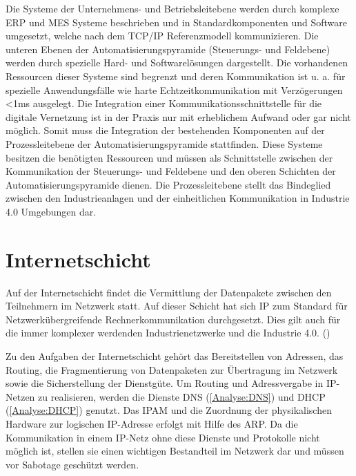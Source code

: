 Die Systeme der Unternehmens- und Betriebsleitebene werden durch komplexe \ac{ERP} und \ac{MES} Systeme beschrieben und in Standardkomponenten und Software umgesetzt, welche nach dem \ac{TCP}/\ac{IP} Referenzmodell kommunizieren. Die unteren Ebenen der Automatisierungspyramide (Steuerungs- und Feldebene) werden durch spezielle Hard- und Softwarelösungen dargestellt. Die vorhandenen Ressourcen dieser Systeme sind begrenzt und deren Kommunikation ist u. a. für spezielle Anwendungsfälle wie harte Echtzeitkommunikation mit Verzögerungen <1ms ausgelegt. Die Integration einer Kommunikationsschnittstelle für die digitale Vernetzung ist in der Praxis nur mit erheblichem Aufwand oder gar nicht möglich. Somit muss die Integration der bestehenden Komponenten auf der Prozessleitebene der Automatisierungspyramide stattfinden. Diese Systeme besitzen die benötigten Ressourcen und müssen als Schnittstelle zwischen der Kommunikation der Steuerungs- und Feldebene und den oberen Schichten der Automatisierungspyramide dienen. Die Prozessleitebene stellt das Bindeglied zwischen den Industrieanlagen und der einheitlichen Kommunikation in Industrie 4.0 Umgebungen dar. 

\section{Internetschicht}
Auf der Internetschicht findet die Vermittlung der Datenpakete zwischen den Teilnehmern im Netzwerk statt. Auf dieser Schicht hat sich \ac{IP} zum Standard für Netzwerkübergreifende Rechnerkommunikation durchgesetzt. Dies gilt auch für die immer komplexer werdenden Industrienetzwerke und die Industrie 4.0. (\cite{meinel2011})

Zu den Aufgaben der Internetschicht gehört das Bereitstellen von Adressen, das Routing, die Fragmentierung von Datenpaketen zur Übertragung im Netzwerk sowie die Sicherstellung der Dienstgüte. Um Routing und Adressvergabe in \ac{IP}-Netzen zu realisieren, werden die Dienste \ac{DNS} (\autoref{Analyse:DNS}) und \ac{DHCP} (\autoref{Analyse:DHCP}) genutzt. Das \ac{IPAM} und die Zuordnung der physikalischen Hardware zur logischen \ac{IP}-Adresse erfolgt mit Hilfe des \ac{ARP}. Da die Kommunikation in einem \ac{IP}-Netz ohne diese Dienste und Protokolle nicht möglich ist, stellen sie einen wichtigen Bestandteil im Netzwerk dar und müssen vor Sabotage geschützt werden.

